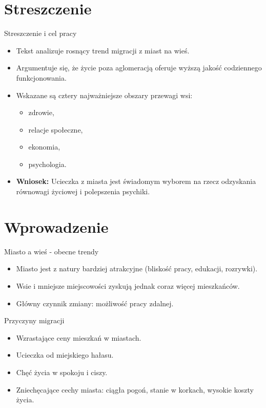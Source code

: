 \section{Streszczenie} 
\begin{frame}{Streszczenie i cel pracy}
    \begin{itemize}
        \item Tekst analizuje rosnący trend migracji z miast na wieś.
        \item Argumentuje się, że życie poza aglomeracją oferuje wyższą jakość codziennego funkcjonowania.
        \item Wskazane są cztery najważniejsze obszary przewagi wsi: 
        \begin{itemize}
            \item zdrowie,
            \item relacje społeczne,
            \item ekonomia,
            \item psychologia.
        \end{itemize}
        \item \textbf{Wniosek:} Ucieczka z miasta jest świadomym wyborem na rzecz odzyskania równowagi życiowej i polepszenia psychiki.
    \end{itemize}
\end{frame}

\section{Wprowadzenie}
\begin{frame}{Miasto a wieś - obecne trendy}
    \begin{itemize}
        \item Miasto jest z natury bardziej atrakcyjne (bliskość pracy, edukacji, rozrywki).
        \item Wsie i mniejsze miejscowości zyskują jednak coraz więcej mieszkańców.
        \item Główny czynnik zmiany: możliwość pracy zdalnej.
    \end{itemize}
\end{frame}

\begin{frame}{Przyczyny migracji}
    \begin{itemize}
        \item Wzrastające ceny mieszkań w miastach.
        \item Ucieczka od miejskiego hałasu.
        \item Chęć życia w spokoju i ciszy.
        \item Zniechęcające cechy miasta: ciągła pogoń, stanie w korkach, wysokie koszty życia.
    \end{itemize}
\end{frame}

